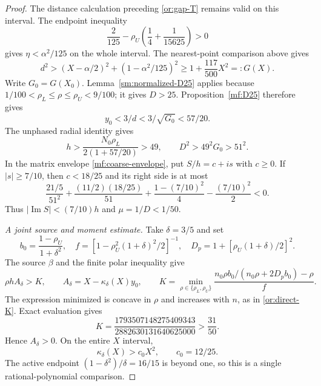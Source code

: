 \documentclass[11pt,reqno]{amsart}
\numberwithin{equation}{section}
\theoremstyle{definition}
\theoremstyle{remark}
\renewcommand{\Im}{\operatorname{Im}}
\begin{document}
\begin{proof}
The distance calculation preceding \eqref{or:gap-T} remains
valid on this interval. The endpoint inequality
\[
 \frac2{125}-\rho_U\left(\frac14+\frac1{15625}\right)>0
\]
gives $\eta<\alpha^2/125$ on the whole interval.
The nearest-point comparison above gives
\[
 d^2>(X-\alpha/2)^2+(1-\alpha^2/125)^2
 \ge1+\frac{117}{500}X^2=:G(X).
\]
Write $G_0=G(X_0)$.
Lemma~\ref{sm:normalized-D25} applies because
$1/100<\rho_L\le\rho\le\rho_U<9/100$; it gives $D>25$.
Proposition~\ref{mf:D25} therefore gives
\[
 y_0<3/d<3/\sqrt{G_0}<57/20.
\]
The unphased radial identity gives
\[
 h>\frac{N_0\rho_L}{2(1+57/20)}>49,\qquad
 D^2>49^2G_0>51^2.
\]
In the matrix envelope \eqref{mf:coarse-envelope}, put
$S/h=c+is$ with $c\ge0$.
If $|s|\ge7/10$, then $c<18/25$ and its right side is at most
\[
 \frac{21/5}{51^2}
 +\frac{(11/2)(18/25)}{51}
 +\frac{1-(7/10)^2}{4}-\frac{(7/10)^2}{2}<0.
\]
Thus $|\Im S|<(7/10)h$ and $\mu=1/D<1/50$.

\smallskip
\noindent\emph{A joint source and moment estimate.}
Take $\delta=3/5$ and set
\[
 b_0=\frac{1-\rho_U}{1+\delta^2},\quad
 f=[1-\rho_U^2(1+\delta)^2/2]^{-1},\quad
 D_p=1+[\rho_U(1+\delta)/2]^2.
\]
The source $\beta$ and the finite polar inequality give
\begin{equation}\label{sm:highX-K}
 \rho h A_\delta>K,\qquad
 A_\delta=X-\kappa_\delta(X)y_0,\qquad
 K=\min_{\rho\in\{\rho_L,\rho_U\}}
 \frac{n_0\rho b_0/(n_0\rho+2D_pb_0)-\rho}{f}.
\end{equation}
The expression minimized is concave in $\rho$ and increases
with $n$, as in \eqref{or:direct-K}. Exact evaluation gives
\[
 K=\frac{1793507148275409343}{2882630131640625000}
       >\frac{31}{50}.
\]
Hence $A_\delta>0$.
On the entire $X$ interval,
\begin{equation}\label{sm:highX-kappa}
 \kappa_\delta(X)>c_0X^2,\qquad c_0=12/25.
\end{equation}
The active endpoint $(1-\delta^2)/\delta=16/15$ is beyond one,
so this is a single rational-polynomial comparison.


\end{proof}
\end{document}
